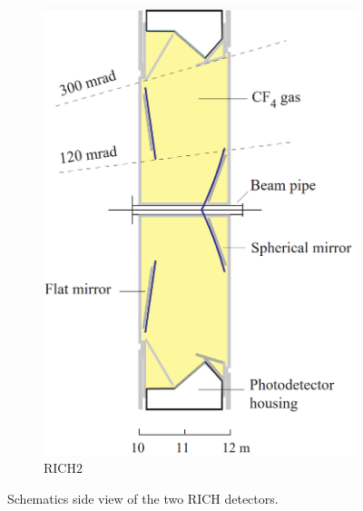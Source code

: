 \begin{figure}
\begin{subfigure}{0.48\textwidth}
    \includegraphics[width=0.78\linewidth]{figures/rich2.png}
    \caption{RICH$2$}\label{rich2}
    \end{subfigure}
    \caption{Schematics side view of the two RICH detectors.}
    \label{fig:rich}
\end{figure}

